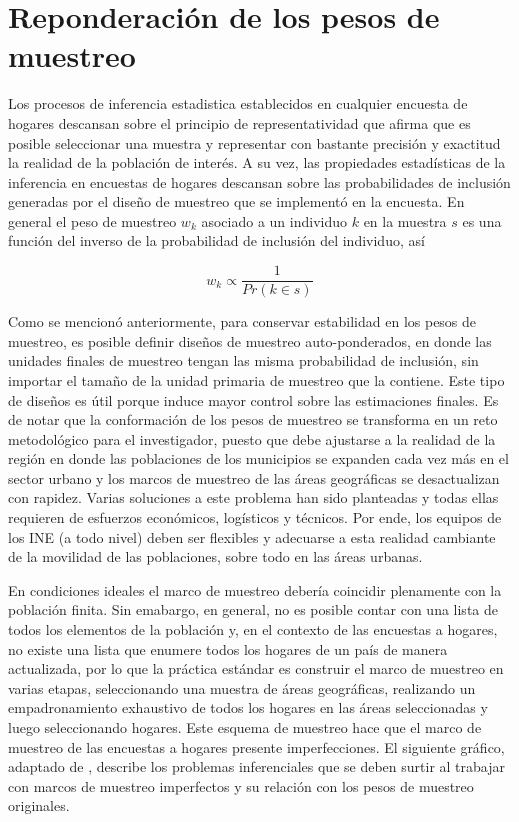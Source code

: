 \documentclass[12pt,spanish,]{book}
\begin{document}
\hypertarget{reponderacion-de-los-pesos-de-muestreo}{%
\section{Reponderación de los pesos de muestreo}\label{reponderacion-de-los-pesos-de-muestreo}}

Los procesos de inferencia estadistica establecidos en cualquier encuesta de hogares descansan sobre el principio de representatividad que afirma que es posible seleccionar una muestra y representar con bastante precisión y exactitud la realidad de la población de interés. A su vez, las propiedades estadísticas de la inferencia en encuestas de hogares descansan sobre las probabilidades de inclusión generadas por el diseño de muestreo que se implementó en la encuesta. En general el peso de muestreo \(w_k\) asociado a un individuo \(k\) en la muestra \(s\) es una función del inverso de la probabilidad de inclusión del individuo, así

\[
w_k \propto \frac{1}{Pr(k\in s)}
\]

Como se mencionó anteriormente, para conservar estabilidad en los pesos de muestreo, es posible definir diseños de muestreo auto-ponderados, en donde las unidades finales de muestreo tengan las misma probabilidad de inclusión, sin importar el tamaño de la unidad primaria de muestreo que la contiene. Este tipo de diseños es útil porque induce mayor control sobre las estimaciones finales. Es de notar que la conformación de los pesos de muestreo se transforma en un reto metodológico para el investigador, puesto que debe ajustarse a la realidad de la región en donde las poblaciones de los municipios se expanden cada vez más en el sector urbano y los marcos de muestreo de las áreas geográficas se desactualizan con rapidez. Varias soluciones a este problema han sido planteadas \autocite{Gambino_Silva_2009} y todas ellas requieren de esfuerzos económicos, logísticos y técnicos. Por ende, los equipos de los INE (a todo nivel) deben ser flexibles y adecuarse a esta realidad cambiante de la movilidad de las poblaciones, sobre todo en las áreas urbanas.

En condiciones ideales el marco de muestreo debería coincidir plenamente con la población finita. Sin emabargo, en general, no es posible contar con una lista de todos los elementos de la población y, en el contexto de las encuestas a hogares, no existe una lista que enumere todos los hogares de un país de manera actualizada, por lo que la práctica estándar es construir el marco de muestreo en varias etapas, seleccionando una muestra de áreas geográficas, realizando un empadronamiento exhaustivo de todos los hogares en las áreas seleccionadas y luego seleccionando hogares. Este esquema de muestreo hace que el marco de muestreo de las encuestas a hogares presente imperfecciones. El siguiente gráfico, adaptado de \textcite{Valliant_Dever_2017}, describe los problemas inferenciales que se deben surtir al trabajar con marcos de muestreo imperfectos y su relación con los pesos de muestreo originales.
\end{document}
